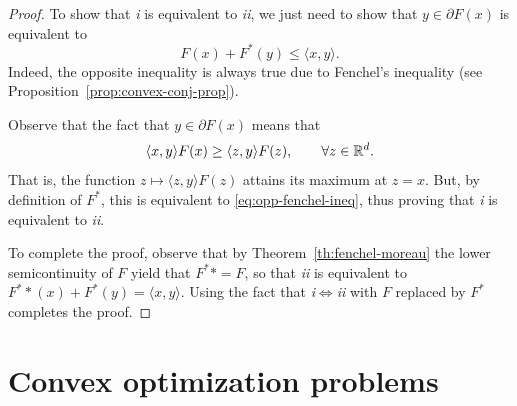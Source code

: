 \documentclass{report}
\begin{document}
\begin{proof}
	To show that \emph{i} is equivalent to \emph{ii}, we just need to show that $y\in \partial F(x)$ is equivalent to 
	\begin{equation}
		\label{eq:opp-fenchel-ineq}
		F(x)+F^*(y) \le \langle  x,y\rangle.
	\end{equation}
	Indeed, the opposite inequality is always true due to Fenchel's inequality (see Proposition~\ref{prop:convex-conj-prop}).

	Observe that the fact that $y\in\partial F(x)$ means that
	\begin{equation}
		\langle x,y\rangle F(x)
		\ge \langle z,y\rangle F(z), \qquad \forall z\in \mathbb{R}^d.
	\end{equation}
	That is, the function $z\mapsto \langle z,y\rangle F(z)$ attains its maximum at $z=x$. But, by definition of $F^*$, this is equivalent to \eqref{eq:opp-fenchel-ineq}, thus proving that \emph{i} is equivalent to \emph{ii}.

	To complete the proof, observe that by Theorem~\ref{th:fenchel-moreau} the lower semicontinuity of $F$ yield that $F^**=F$, so that \emph{ii} is equivalent to $F^**(x)+F^*(y)=\langle x,y\rangle$. Using the fact that \emph{i}$\iff$\emph{ii} with $F$ replaced by $F^*$ completes the proof.
\end{proof}


\section{Convex optimization problems}

\end{document}
